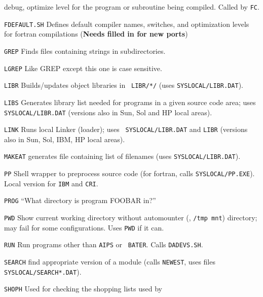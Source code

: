 {                         debug, optimize level for the program or
                         subroutine being compiled.  Called by {\tt FC}.
\item{\tt FDEFAULT.SH\quad} Defines default compiler names, switches,
                         and optimization levels for fortran
                         compilations ({\bf Needs filled in for new
                         ports})
\item{{\tt GREP}\quad}   Finds files containing strings in subdirectories.
\item{{\tt LGREP}\quad}  Like GREP except this one is case sensitive.
\item{\tt LIBR\quad}     Builds/updates object libraries in {\tt
                         \dol LIBR/*/} (uses {\tt \dol SYSLOCAL/LIBR.DAT}).
\item{\tt LIBS\quad}     Generates library list needed for programs in a
                         given source code area; uses {\tt
                         \dol SYSLOCAL/LIBR.DAT} (versions also in Sun, Sol
                         and HP local areas).
\item{\tt LINK\quad}     Runs local Linker (loader); uses {\tt
                         \dol SYSLOCAL/LIBR.DAT} and {\tt LIBR} (versions
                         also in Sun, Sol, IBM, HP local areas).
\item{\tt MAKEAT\quad}   generates file containing list of filenames
                         (uses {\tt \dol SYSLOCAL/LIBR.DAT}).
\item{\tt PP\quad}       Shell wrapper to preprocess source code (for
                         fortran, calls {\tt \dol SYSLOCAL/PP.EXE}).  Local
                         version for {\tt IBM} and {\tt CRI}.
\item{{\tt PROG}\quad}   ``What directory is program FOOBAR in?''
\item{\tt PWD\quad}      Show current working directory without
                         automounter (\eg, {\tt /tmp mnt}) directory;
                         may fail for some configurations.  Uses
                         {\tt\dol PWD} if it can.
\item{\tt RUN\quad}      Run programs other than {\tt AIPS} or {\tt
                         BATER}.  Calls {\tt DADEVS.SH}.
\item{\tt SEARCH\quad}   find appropriate version of a module (calls
                         {\tt NEWEST}, uses files
                         {\tt\dol SYSLOCAL/SEA\-RCH*.DAT}).
\item{{\tt SHOPH}\quad}  Used for checking the shopping lists used by
}
